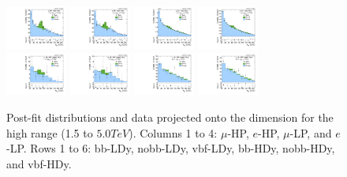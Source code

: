 \begin{figure}[htbp]
  \includegraphics[width=0.18\textwidth]{fig/fitValidation/PostFit_SR_MJJ_MVV1500to5000__mu_HP_nobb_HDy_Run2.pdf}
  \includegraphics[width=0.18\textwidth]{fig/fitValidation/PostFit_SR_MJJ_MVV1500to5000__e_HP_nobb_HDy_Run2.pdf}
  \includegraphics[width=0.18\textwidth]{fig/fitValidation/PostFit_SR_MJJ_MVV1500to5000__mu_LP_nobb_HDy_Run2.pdf}
  \includegraphics[width=0.18\textwidth]{fig/fitValidation/PostFit_SR_MJJ_MVV1500to5000__e_LP_nobb_HDy_Run2.pdf}\\
  \includegraphics[width=0.18\textwidth]{fig/fitValidation/PostFit_SR_MJJ_MVV1500to5000__mu_HP_vbf_HDy_Run2.pdf}
  \includegraphics[width=0.18\textwidth]{fig/fitValidation/PostFit_SR_MJJ_MVV1500to5000__e_HP_vbf_HDy_Run2.pdf}
  \includegraphics[width=0.18\textwidth]{fig/fitValidation/PostFit_SR_MJJ_MVV1500to5000__mu_LP_vbf_HDy_Run2.pdf}
  \includegraphics[width=0.18\textwidth]{fig/fitValidation/PostFit_SR_MJJ_MVV1500to5000__e_LP_vbf_HDy_Run2.pdf}\\
  \caption{
    Post-fit distributions and data projected onto the \MJ dimension for the high \MVV range (1.5 to $5.0\unit{TeV}$).
    Columns 1 to 4: $\mu$-HP, $e$-HP, $\mu$-LP, and $e$-LP.
    Rows 1 to 6: bb-LDy, nobb-LDy, vbf-LDy, bb-HDy, nobb-HDy, and vbf-HDy.
  }
  \label{fig:postfit_MJJ_MVV1500to5000_Run2}
\end{figure}

